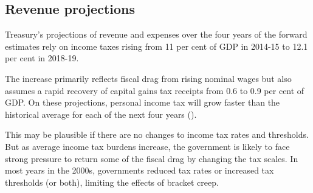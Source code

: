 \documentclass[twoside,english]{grattanBudgetRepairb5portrait}
\begin{document}
\subsection{Revenue projections}
Treasury’s projections of revenue and expenses over the four years of the forward estimates rely on income taxes rising from 11 per cent of GDP in 2014-15 to 12.1 per cent in 2018-19. 

The increase primarily reflects fiscal drag from rising nominal wages but also assumes a rapid recovery of capital gains tax receipts from 0.6 to 0.9 per cent of GDP\@. On these projections, personal income tax will grow faster than the historical average for each of the next four years ().

This may be plausible if there are no changes to income tax rates and thresholds. But as average income tax burdens increase, the government is likely to face strong pressure to return some of the fiscal drag by changing the tax scales. In most years in the 2000s, governments reduced tax rates or increased tax thresholds (or both), limiting the effects of bracket creep. 
\end{document}

